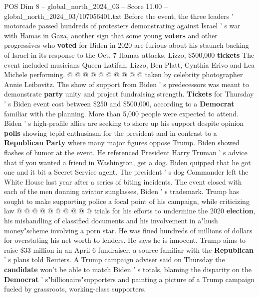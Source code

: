 \begin{textsample}{POS Dim 8 – global\_north\_2024\_03 – Score 11.00 – global\_north\_2024\_03/107056401.txt}
Before the event, the three leaders ' motorcade passed hundreds of protesters demonstrating against Israel ' s war with Hamas in Gaza, another sign that some young \textbf{voters} and other progressives who \textbf{voted} for Biden in 2020 are furious about his staunch backing of Israel in its response to the Oct. 7 Hamas attacks.
Lizzo, \$500,000 \textbf{tickets} The event included musicians Queen Latifah, Lizzo, Ben Platt, Cynthia Erivo and Lea Michele performing. @ @ @ @ @ @ @ @ @ @ taken by celebrity photographer Annie Leibovitz.
The show of support from Biden ' s predecessors was meant to demonstrate \textbf{party} unity and project fundraising strength. \textbf{Tickets} for Thursday ' s Biden event cost between \$250 and \$500,000, according to a \textbf{Democrat} familiar with the planning.
More than 5,000 people were expected to attend.
Biden ' s high-profile allies are seeking to shore up his support despite opinion \textbf{polls} showing tepid enthusiasm for the president and in contrast to a \textbf{Republican} \textbf{Party} where many major figures oppose Trump.
Biden showed flashes of humor at the event.
He referenced President Harry Truman ' s advice that if you wanted a friend in Washington, get a dog.
Biden quipped that he got one and it bit a Secret Service agent.
The president ' s dog Commander left the White House last year after a series of biting incidents.
The event closed with each of the men donning aviator sunglasses, Biden ' s trademark.
Trump has sought to make supporting police a focal point of his campaign, while criticizing law @ @ @ @ @ @ @ @ @ @ trials for his efforts to undermine the 2020 \textbf{election}, his mishandling of classified documents and his involvement in a"hush money"scheme involving a porn star.
He was fined hundreds of millions of dollars for overstating his net worth to lenders.
He says he is innocent.
Trump aims to raise \$33 million in an April 6 fundraiser, a source familiar with the \textbf{Republican} ' s plans told Reuters.
A Trump campaign adviser said on Thursday the \textbf{candidate} won't be able to match Biden ' s totals, blaming the disparity on the \textbf{Democrat} ' s"billionaire"supporters and painting a picture of a Trump campaign fueled by grassroots, working-class supporters.

\end{textsample}
